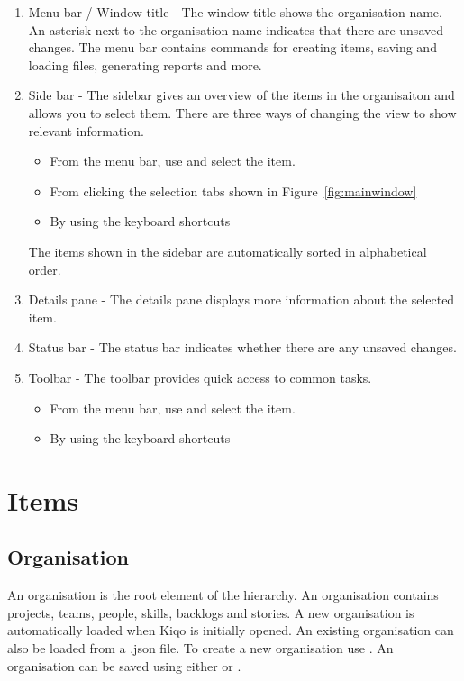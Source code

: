 \documentclass[11pt,fleqn]{book} %
\begin{document}
\begin{enumerate}
\item Menu bar / Window title - The window title shows the organisation name. An asterisk next to the organisation name indicates that there are unsaved changes.
The menu bar contains commands for creating items, saving and loading files, generating reports and more.
\item Side bar - The sidebar gives an overview of the items in the organisaiton and allows you to select them.
There are three ways of changing the view to show relevant information.
    \begin{itemize}
      \item From the menu bar, use  and select the item.
      \item From clicking the selection tabs shown in Figure~\ref{fig:mainwindow}
      \item By using the keyboard shortcuts 
    \end{itemize}
    The items shown in the sidebar are automatically sorted in alphabetical order.
\item Details pane - The details pane displays more information about the selected item.
\item Status bar - The status bar indicates whether there are any unsaved changes.
\item Toolbar - The toolbar provides quick access to common tasks.
    \begin{itemize}
      \item From the menu bar, use  and select the item.
      \item By using the keyboard shortcuts \keys{\ctrl + /}
    \end{itemize}
\end{enumerate}


\chapter{Items}
\section{Organisation}
An organisation is the root element of the hierarchy. An organisation contains projects, teams, people, skills, backlogs and stories.
A new organisation is automatically loaded when Kiqo is initially opened. An existing organisation can also be loaded
from a .json file. To create a new organisation use . An organisation can be saved using
either  or .
\end{document}
